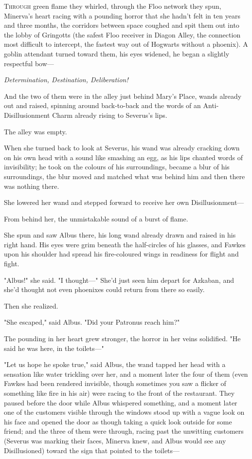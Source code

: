 
\lettrine{T}{hrough} green
flame they whirled, through the Floo network they spun, Minerva's heart racing
with a pounding horror that she hadn't felt in ten years and three months, the
corridors between space coughed and spit them out into the lobby of Gringotts
(the safest Floo receiver in Diagon Alley, the connection most difficult to
intercept, the fastest way out of Hogwarts without a phoenix). A goblin
attendant turned toward them, his eyes widened, he began a slightly respectful
bow---

\emph{Determination, Destination, Deliberation!}

And the two of them were in the alley just behind Mary's Place, wands
already out and raised, spinning around back-to-back and the words of an
Anti-Disillusionment Charm already rising to Severus's lips.

The alley was empty.

When she turned back to look at Severus, his wand was already cracking down on
his own head with a sound like smashing an egg, as his lips chanted words of
invisibility; he took on the colours of his surroundings, became a blur of his
surroundings, the blur moved and matched what was behind him and then there was
nothing there.

She lowered her wand and stepped forward to receive her own Disillusionment---

From behind her, the unmistakable sound of a burst of flame.

She spun and saw Albus there, his long wand already drawn and raised in his
right hand. His eyes were grim beneath the half-circles of his glasses, and
Fawkes upon his shoulder had spread his fire-coloured wings in readiness for
flight and fight.

"Albus!" she said. "I thought---" She'd just seen him depart for Azkaban, and
she'd thought not even phoenixes could return from there so easily.

Then she realized.

"She escaped," said Albus. "Did your Patronus reach him?"

The pounding in her heart grew stronger, the horror in her veins solidified.
"He said he was here, in the toilets---"

"Let us hope he spoke true," said Albus, the wand tapped her head with a
sensation like water trickling over her, and a moment later the four of them
(even Fawkes had been rendered invisible, though sometimes you saw a flicker of
something like fire in his air) were racing to the front of the restaurant.
They paused before the door while Albus whispered something, and a moment later
one of the customers visible through the windows stood up with a vague look on
his face and opened the door as though taking a quick look outside for some
friend; and the three of them were through, racing past the unwitting customers
(Severus was marking their faces, Minerva knew, and Albus would see any
Disillusioned) toward the sign that pointed to the toilets---


